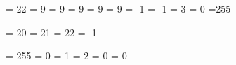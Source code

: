  = 22 %
 =  9 %
 =  9 %
 =  9 %
 =  9 %
 =  9 %
 = -1 %
 = -1 %
 =  3 %
 =  0 %
 =255 %

\countdef\insc@unt        = 20 %
\countdef\allocationnumber= 21 %
\countdef\m@ne            = 22 %
         \m@ne            = -1 

\def\wlog{\immediate\write\m@ne} %


\countdef \count@   = 255
\dimendef \dimen@   =   0
\dimendef \dimen@i  =   1 %
\dimendef \dimen@ii =   2
\skipdef  \skip@    =   0
\toksdef  \toks@    =   0


\def\newcount   {\alloc@0\count   \countdef \insc@unt}
\def\newdimen   {\alloc@1\dimen   \dimendef \insc@unt}
\def\newskip    {\alloc@2\skip    \skipdef  \insc@unt}
\def\newmuskip  {\alloc@3\muskip  \muskipdef\@cclvi  }
\def\newbox     {\alloc@4\box     \chardef  \insc@unt}
\def\newtoks    {\alloc@5\toks    \toksdef  \@cclvi  }
\def\newread    {\alloc@6\read    \chardef  \sixt@@n }
\def\newwrite   {\alloc@7\write   \chardef  \sixt@@n }
\def\newfam     {\alloc@8\fam     \chardef  \sixt@@n }
\def\newlanguage{\alloc@9\language\chardef  \@cclvi  }

\def\newhelp#1#2{\newtoks#1#1\expandafter{\csname#2\endcsname}}

